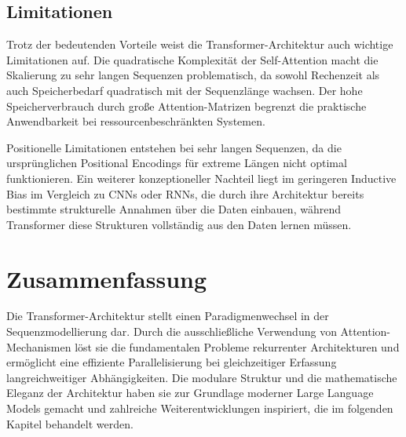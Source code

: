 \subsection{Limitationen}

Trotz der bedeutenden Vorteile weist die Transformer-Architektur auch wichtige Limitationen auf. Die quadratische Komplexität der Self-Attention macht die Skalierung zu sehr langen Sequenzen problematisch, da sowohl Rechenzeit als auch Speicherbedarf quadratisch mit der Sequenzlänge wachsen. Der hohe Speicherverbrauch durch große Attention-Matrizen begrenzt die praktische Anwendbarkeit bei ressourcenbeschränkten Systemen.

Positionelle Limitationen entstehen bei sehr langen Sequenzen, da die ursprünglichen Positional Encodings für extreme Längen nicht optimal funktionieren. Ein weiterer konzeptioneller Nachteil liegt im geringeren Inductive Bias im Vergleich zu CNNs oder RNNs, die durch ihre Architektur bereits bestimmte strukturelle Annahmen über die Daten einbauen, während Transformer diese Strukturen vollständig aus den Daten lernen müssen.

\section{Zusammenfassung}

Die Transformer-Architektur stellt einen Paradigmenwechsel in der Sequenzmodellierung dar. Durch die ausschließliche Verwendung von Attention-Mechanismen löst sie die fundamentalen Probleme rekurrenter Architekturen und ermöglicht eine effiziente Parallelisierung bei gleichzeitiger Erfassung langreichweitiger Abhängigkeiten. Die modulare Struktur und die mathematische Eleganz der Architektur haben sie zur Grundlage moderner Large Language Models gemacht und zahlreiche Weiterentwicklungen inspiriert, die im folgenden Kapitel behandelt werden.